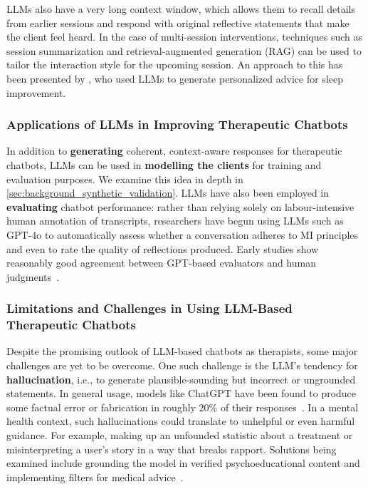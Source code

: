 LLMs also have a very long context window, which allows them to recall details from earlier sessions and respond with original reflective statements that make the client feel heard. In the case of multi-session interventions, techniques such as session summarization and retrieval-augmented generation (RAG) can be used to tailor the interaction style for the upcoming session. An approach to this has been presented by \citet{corda2024context}, who used LLMs to generate personalized advice for sleep improvement.


\subsubsection{Applications of LLMs in Improving Therapeutic Chatbots}
In addition to \textbf{generating} coherent, context-aware responses for therapeutic chatbots, LLMs can be used in \textbf{modelling the clients} for training and evaluation purposes. We examine this idea in depth in \cref{sec:background_synthetic_validation}. LLMs have also been employed in \textbf{evaluating} chatbot performance: rather than relying solely on labour-intensive human annotation of transcripts, researchers have begun using LLMs such as GPT-4o to automatically assess whether a conversation adheres to MI principles and even to rate the quality of reflections produced. Early studies show reasonably good agreement between GPT-based evaluators and human judgments~\cite{Scholich2025}.


\subsubsection{Limitations and Challenges in Using LLM-Based Therapeutic Chatbots}
Despite the promising outlook of LLM-based chatbots as therapists, some major challenges are yet to be overcome. One such challenge is the LLM's tendency for \textbf{hallucination}, i.e., to generate plausible-sounding but incorrect or ungrounded statements. In general usage, models like ChatGPT have been found to produce some factual error or fabrication in roughly 20\% of their responses~\cite{Li2023}. In a mental health context, such hallucinations could translate to unhelpful or even harmful guidance. For example, making up an unfounded statistic about a treatment or misinterpreting a user's story in a way that breaks rapport. Solutions being examined include grounding the model in verified psychoeducational content and implementing filters for medical advice~\cite{Amugongo2025RAG}.


